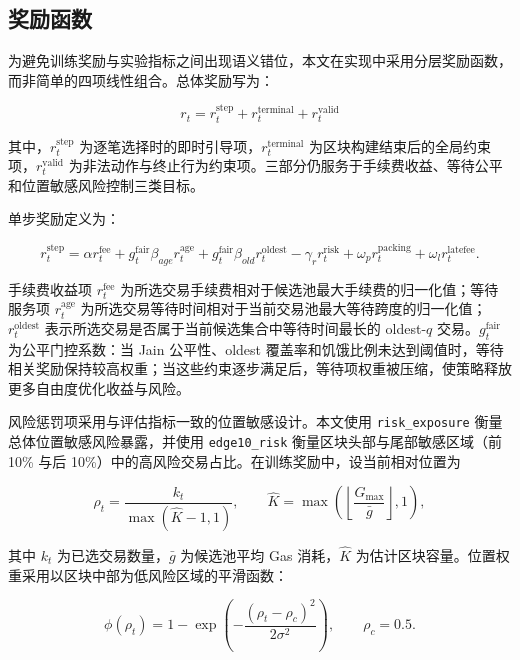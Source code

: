 \subsection{奖励函数}

为避免训练奖励与实验指标之间出现语义错位，本文在实现中采用分层奖励函数，而非简单的四项线性组合。总体奖励写为：

\begin{equation}
  r_t = r_t^{\text{step}} + r_t^{\text{terminal}} + r_t^{\text{valid}}
\end{equation}

其中，$r_t^{\text{step}}$ 为逐笔选择时的即时引导项，$r_t^{\text{terminal}}$ 为区块构建结束后的全局约束项，$r_t^{\text{valid}}$ 为非法动作与终止行为约束项。三部分仍服务于手续费收益、等待公平和位置敏感风险控制三类目标。

单步奖励定义为：

\begin{equation}
  r_t^{\text{step}}
  =
  \alpha r_t^{\text{fee}}
  + g_t^{\text{fair}}\beta_{age} r_t^{\text{age}}
  + g_t^{\text{fair}}\beta_{old} r_t^{\text{oldest}}
  - \gamma_r r_t^{\text{risk}}
  + \omega_p r_t^{\text{packing}}
  + \omega_l r_t^{\text{latefee}} .
\end{equation}

手续费收益项 $r_t^{\text{fee}}$ 为所选交易手续费相对于候选池最大手续费的归一化值；等待服务项 $r_t^{\text{age}}$ 为所选交易等待时间相对于当前交易池最大等待跨度的归一化值；$r_t^{\text{oldest}}$ 表示所选交易是否属于当前候选集合中等待时间最长的 oldest-$q$ 交易。$g_t^{\text{fair}}$ 为公平门控系数：当 Jain 公平性、oldest 覆盖率和饥饿比例未达到阈值时，等待相关奖励保持较高权重；当这些约束逐步满足后，等待项权重被压缩，使策略释放更多自由度优化收益与风险。

风险惩罚项采用与评估指标一致的位置敏感设计。本文使用 \texttt{risk\_exposure} 衡量总体位置敏感风险暴露，并使用 \texttt{edge10\_risk} 衡量区块头部与尾部敏感区域（前 10\% 与后 10\%）中的高风险交易占比。在训练奖励中，设当前相对位置为

\begin{equation}
  \rho_t = \frac{k_t}{\max(\hat{K}-1,1)}, \qquad
  \hat{K}=\max\left(\left\lfloor \frac{G_{\max}}{\bar{g}} \right\rfloor,1\right),
\end{equation}

其中 $k_t$ 为已选交易数量，$\bar{g}$ 为候选池平均 Gas 消耗，$\hat{K}$ 为估计区块容量。位置权重采用以区块中部为低风险区域的平滑函数：

\begin{equation}
  \phi(\rho_t)=1-\exp\left(-\frac{(\rho_t-\rho_c)^2}{2\sigma^2}\right),
  \qquad \rho_c=0.5 .
\end{equation}

